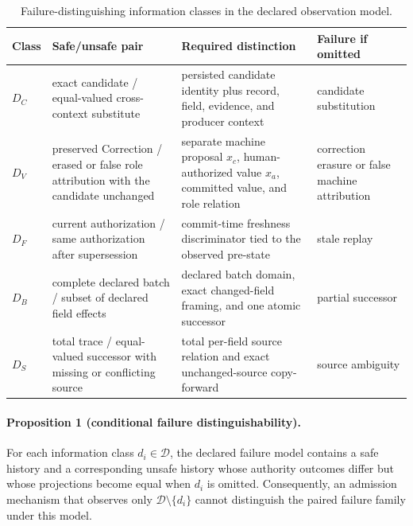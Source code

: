 \begin{table}[t]
\centering
\footnotesize
\caption{Failure-distinguishing information classes in the declared observation model.}
\label{tab:distinctions}
\begin{tabularx}{\textwidth}{@{}l>{\raggedright\arraybackslash}p{}>{\raggedright\arraybackslash}p{}>{\raggedright\arraybackslash}X@{}}
\toprule
Class & Safe/unsafe pair & Required distinction & Failure if omitted \\
\midrule
$D_C$ & exact candidate / equal-valued cross-context substitute & persisted candidate identity plus record, field, evidence, and producer context & candidate substitution \\
$D_V$ & preserved Correction / erased or false role attribution with the candidate unchanged & separate machine proposal $x_c$, human-authorized value $x_a$, committed value, and role relation & correction erasure or false machine attribution \\
$D_F$ & current authorization / same authorization after supersession & commit-time freshness discriminator tied to the observed pre-state & stale replay \\
$D_B$ & complete declared batch / subset of declared field effects & declared batch domain, exact changed-field framing, and one atomic successor & partial successor \\
$D_S$ & total trace / equal-valued successor with missing or conflicting source & total per-field source relation and exact unchanged-source copy-forward & source ambiguity \\
\bottomrule
\end{tabularx}
\end{table}

\paragraph{Proposition 1 (conditional failure distinguishability).}
For each information class $d_i\in\mathcal D$, the declared failure model contains a safe history and a corresponding unsafe history whose authority outcomes differ but whose projections become equal when $d_i$ is omitted. Consequently, an admission mechanism that observes only $\mathcal D\setminus\{d_i\}$ cannot distinguish the paired failure family under this model.

